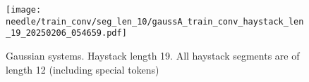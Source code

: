 \begin{figure}
    \centering
    \texttt{[image: needle/train\_conv/seg\_len\_10/gaussA\_train\_conv\_haystack\_len\_19\_20250206\_054659.pdf]}
    \caption{Gaussian systems. Haystack length 19. All haystack segments are of length 12 (including special tokens)}
    \label{fig:gauss_needle_train_conv_haystack_len_19_all_haystack_len_12}
\end{figure}


